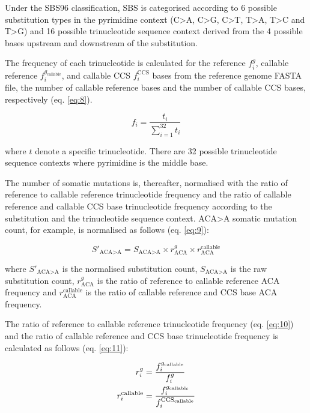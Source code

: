 Under the SBS96 classification, SBS is categorised according to 6 possible substitution types in the pyrimidine context (C>A, C>G, C>T, T>A, T>C and T>G) and 16 possible trinucleotide sequence context derived from the 4 possible bases upstream and downstream of the substitution. 

The frequency of each trinucleotide is calculated for the reference $f^{g}_{i}$, callable reference $f^{g_{\text{callable}}}_{i}$, and callable CCS $f^{\text{CCS}}_{i}$ bases from the reference genome FASTA file, the number of callable reference bases and the number of callable CCS bases, respectively (eq. \ref{eq:8}). 

\begin{equation} \label{eq:8}
f_{i} = \frac{t_{i}}{\sum^{32}_{i=1} t_{i}}
\end{equation}

where $t$ denote a specific trinucleotide. There are 32 possible trinucleotide sequence contexts where pyrimidine is the middle base. 

The number of somatic mutations is, thereafter, normalised with the ratio of reference to callable reference trinucleotide frequency and the ratio of callable reference and callable CCS base trinucleotide frequency according to the substitution and the trinucleotide sequence context. ACA>A somatic mutation count, for example, is normalised as follows (eq. \ref{eq:9}):

\begin{equation} \label{eq:9}
S'_{\text{ACA>A}} = S_{\text{ACA>A}} \times r^{g}_{\text{ACA}} \times r^{\text{callable}}_{\text{ACA}} 
\end{equation}

where $S'_{\text{ACA>A}}$ is the normalised substitution count, $S_{\text{ACA>A}}$ is the raw substitution count, $r^{g}_{\text{ACA}}$ is the ratio of reference to callable reference ACA frequency and $r^{\text{callable}}_{\text{ACA}}$ is the ratio of callable reference and CCS base ACA frequency. 

The ratio of reference to callable reference trinucleotide frequency (eq. \ref{eq:10}) and the ratio of callable reference and CCS base trinucleotide frequency is calculated as follows (eq. \ref{eq:11}):

\begin{align} 
r^{g}_{i} &= \frac{f^{g_{\text{callable}}}_{i}}{f^{g}_{i}} \label{eq:10} \\ \smallskip
r^{\text{callable}}_{i} &= \frac{f^{g_{\text{callable}}}_{i}}{f^{\text{CCS}_{\text{callable}}}_{i}} \label{eq:11}
\end{align}

